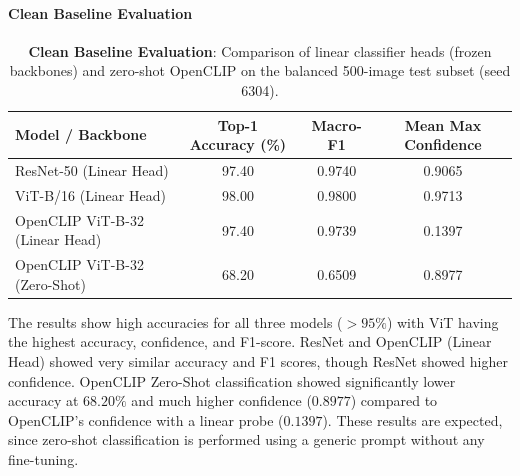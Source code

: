\documentclass{article}
\begin{document}
\paragraph{Clean Baseline Evaluation}
\begin{table}[H]
    \centering
    \caption{\textbf{Clean Baseline Evaluation}: Comparison of linear classifier heads (frozen backbones) and zero-shot OpenCLIP on the balanced 500-image test subset (seed 6304).}
    \label{tab:task1_clean_baseline}
    \begin{tabular}{lccc}
        \toprule
        \textbf{Model / Backbone} & \textbf{Top-1 Accuracy (\%)} & \textbf{Macro-F1} & \textbf{Mean Max Confidence} \\
        \midrule
        ResNet-50 (Linear Head) & 97.40 & 0.9740 & 0.9065 \\
        ViT-B/16 (Linear Head) & 98.00 & 0.9800 & 0.9713 \\
        OpenCLIP ViT-B-32 (Linear Head) & 97.40 & 0.9739 & 0.1397 \\
        OpenCLIP ViT-B-32 (Zero-Shot) & 68.20 & 0.6509 & 0.8977 \\
        \bottomrule
    \end{tabular}
\end{table}
The results show high accuracies for all three models ($>95\%$) with ViT having the highest accuracy, confidence, and F1-score. ResNet and OpenCLIP (Linear Head) showed very similar accuracy and F1 scores, though ResNet showed higher confidence. OpenCLIP Zero-Shot classification showed significantly lower accuracy at $68.20\%$ and much higher confidence ($0.8977$) compared to OpenCLIP's confidence with a linear probe ($0.1397$). These results are expected, since zero-shot classification is performed using a generic prompt without any fine-tuning.
\end{document}
